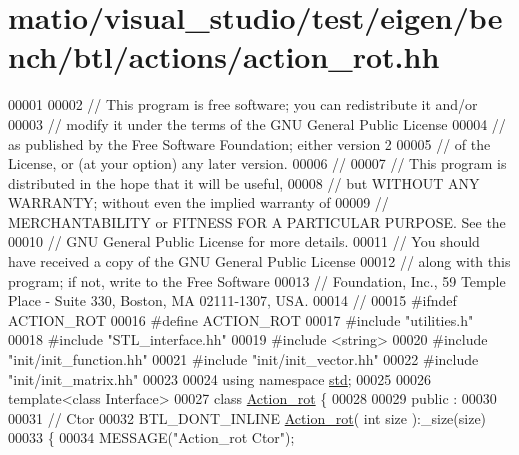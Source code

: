 \hypertarget{matio_2visual__studio_2test_2eigen_2bench_2btl_2actions_2action__rot_8hh_source}{}\section{matio/visual\+\_\+studio/test/eigen/bench/btl/actions/action\+\_\+rot.hh}
\label{matio_2visual__studio_2test_2eigen_2bench_2btl_2actions_2action__rot_8hh_source}

\begin{DoxyCode}
00001 
00002 \textcolor{comment}{// This program is free software; you can redistribute it and/or}
00003 \textcolor{comment}{// modify it under the terms of the GNU General Public License}
00004 \textcolor{comment}{// as published by the Free Software Foundation; either version 2}
00005 \textcolor{comment}{// of the License, or (at your option) any later version.}
00006 \textcolor{comment}{//}
00007 \textcolor{comment}{// This program is distributed in the hope that it will be useful,}
00008 \textcolor{comment}{// but WITHOUT ANY WARRANTY; without even the implied warranty of}
00009 \textcolor{comment}{// MERCHANTABILITY or FITNESS FOR A PARTICULAR PURPOSE.  See the}
00010 \textcolor{comment}{// GNU General Public License for more details.}
00011 \textcolor{comment}{// You should have received a copy of the GNU General Public License}
00012 \textcolor{comment}{// along with this program; if not, write to the Free Software}
00013 \textcolor{comment}{// Foundation, Inc., 59 Temple Place - Suite 330, Boston, MA  02111-1307, USA.}
00014 \textcolor{comment}{//}
00015 \textcolor{preprocessor}{#ifndef ACTION\_ROT}
00016 \textcolor{preprocessor}{#define ACTION\_ROT}
00017 \textcolor{preprocessor}{#include "utilities.h"}
00018 \textcolor{preprocessor}{#include "STL\_interface.hh"}
00019 \textcolor{preprocessor}{#include <string>}
00020 \textcolor{preprocessor}{#include "init/init\_function.hh"}
00021 \textcolor{preprocessor}{#include "init/init\_vector.hh"}
00022 \textcolor{preprocessor}{#include "init/init\_matrix.hh"}
00023 
00024 \textcolor{keyword}{using namespace }\hyperlink{namespacestd}{std};
00025 
00026 \textcolor{keyword}{template}<\textcolor{keyword}{class} Interface>
00027 \textcolor{keyword}{class }\hyperlink{class_action__rot}{Action\_rot} \{
00028 
00029 public :
00030 
00031   \textcolor{comment}{// Ctor}
00032   BTL\_DONT\_INLINE \hyperlink{class_action__rot}{Action\_rot}( \textcolor{keywordtype}{int} size ):\_size(size)
00033   \{
00034     MESSAGE(\textcolor{stringliteral}{"Action\_rot Ctor"});

\end{DoxyCode}
